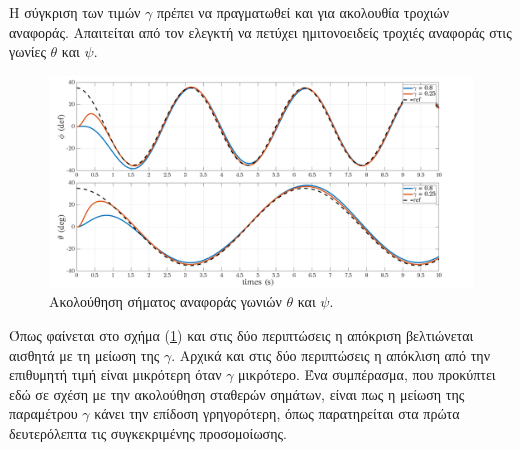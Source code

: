 Η σύγκριση των τιμών $\gamma$ πρέπει να πραγματωθεί και για ακολουθία τροχιών
αναφοράς. Απαιτείται από τον ελεγκτή να πετύχει ημιτονοειδείς τροχιές αναφοράς 
στις γωνίες $\theta$ και $\psi$.
\begin{figure}[htb!]
    \centering
    \includegraphics[width=1\textwidth]{Results/phi_theta.png}
    \caption{Ακολούθηση σήματος αναφοράς γωνιών $\theta$ και $\psi$.}
    \label{fig:roll_pitch_res}
\end{figure}
Όπως φαίνεται στο σχήμα (\ref{fig:roll_pitch_res}) και στις δύο περιπτώσεις η 
απόκριση βελτιώνεται αισθητά με τη μείωση της $\gamma$. Αρχικά και στις δύο 
περιπτώσεις η απόκλιση από την επιθυμητή τιμή είναι μικρότερη όταν $\gamma$ 
μικρότερο. Ένα συμπέρασμα, που προκύπτει εδώ σε σχέση με την ακολούθηση σταθερών
σημάτων, είναι πως η μείωση της παραμέτρου $\gamma$ κάνει την επίδοση 
γρηγορότερη, όπως παρατηρείται στα πρώτα δευτερόλεπτα τις συγκεκριμένης 
προσομοίωσης. 

